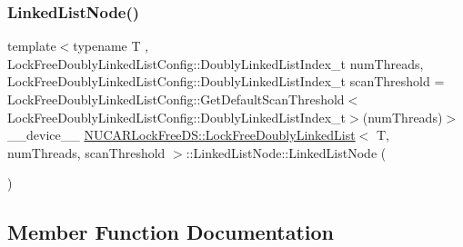 \subsubsection{\texorpdfstring{Linked\+List\+Node()}{LinkedListNode()}}
{\footnotesize\ttfamily template$<$typename T , Lock\+Free\+Doubly\+Linked\+List\+Config\+::\+Doubly\+Linked\+List\+Index\+\_\+t num\+Threads, Lock\+Free\+Doubly\+Linked\+List\+Config\+::\+Doubly\+Linked\+List\+Index\+\_\+t scan\+Threshold = Lock\+Free\+Doubly\+Linked\+List\+Config\+::\+Get\+Default\+Scan\+Threshold$<$\+Lock\+Free\+Doubly\+Linked\+List\+Config\+::\+Doubly\+Linked\+List\+Index\+\_\+t$>$(num\+Threads)$>$ \\
\+\_\+\+\_\+device\+\_\+\+\_\+ \mbox{\hyperlink{class_n_u_c_a_r_lock_free_d_s_1_1_lock_free_doubly_linked_list}{N\+U\+C\+A\+R\+Lock\+Free\+D\+S\+::\+Lock\+Free\+Doubly\+Linked\+List}}$<$ T, num\+Threads, scan\+Threshold $>$\+::Linked\+List\+Node\+::\+Linked\+List\+Node (\begin{DoxyParamCaption}{ }\end{DoxyParamCaption})\hspace{0.3cm}{\ttfamily [inline]}}



\subsection{Member Function Documentation}
\mbox{\label{class_n_u_c_a_r_lock_free_d_s_1_1_lock_free_doubly_linked_list_1_1_linked_list_node_aaba42c339b0a5dc28eb40fca182e104a}} 
